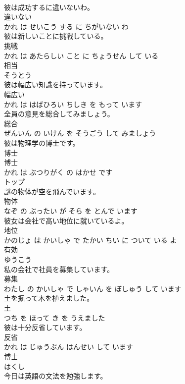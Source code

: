 \documentclass[8pt]{extreport}
\begin{document}
\begin{CJK}{UTF8}{min}
\\	彼は成功するに違いないわ。	
\\	違いない 
\\	かれ は せいこう する に ちがいない わ			
\\	彼は新しいことに挑戦している。	
\\	挑戦 
\\	かれ は あたらしい こと に ちょうせん して いる			
\\	相当	
\\	そうとう		
\\	彼は幅広い知識を持っています。	
\\	幅広い 
\\	かれ は はばひろい ちしき を もって います			
\\	全員の意見を総合してみましょう。	
\\	総合 
\\	ぜんいん の いけん を そうごう して みましょう			
\\	彼は物理学の博士です。	
\\	博士 
\\	博士 
\\	かれ は ぶつりがく の はかせ です			
\\	トップ	
\\	謎の物体が空を飛んでいます。	
\\	物体 
\\	なぞ の ぶったい が そら を とんで います			
\\	彼女は会社で高い地位に就いているよ。	
\\	地位 
\\	かのじょ は かいしゃ で たかい ちい に ついて いる よ			
\\	有効	
\\	ゆうこう		
\\	私の会社で社員を募集しています。	
\\	募集 
\\	わたし の かいしゃ で しゃいん を ぼしゅう して います			
\\	土を掘って木を植えました。	
\\	土 
\\	つち を ほって き を うえました			
\\	彼は十分反省しています。	
\\	反省 
\\	かれ は じゅうぶん はんせい して います			
\\	博士	
\\	はくし		
\\	今日は英語の文法を勉強します。	

\end{CJK}
\end{document}

